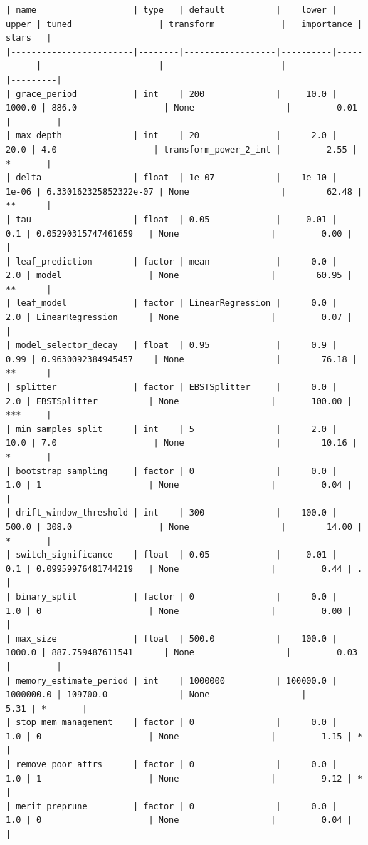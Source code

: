 \documentclass[
  letterpaper,
  DIV=11,
  numbers=noendperiod]{scrreprt}
\begin{document}
\begin{verbatim}
| name                   | type   | default          |    lower |     upper | tuned                 | transform             |   importance | stars   |
|------------------------|--------|------------------|----------|-----------|-----------------------|-----------------------|--------------|---------|
| grace_period           | int    | 200              |     10.0 |    1000.0 | 886.0                 | None                  |         0.01 |         |
| max_depth              | int    | 20               |      2.0 |      20.0 | 4.0                   | transform_power_2_int |         2.55 | *       |
| delta                  | float  | 1e-07            |    1e-10 |     1e-06 | 6.330162325852322e-07 | None                  |        62.48 | **      |
| tau                    | float  | 0.05             |     0.01 |       0.1 | 0.05290315747461659   | None                  |         0.00 |         |
| leaf_prediction        | factor | mean             |      0.0 |       2.0 | model                 | None                  |        60.95 | **      |
| leaf_model             | factor | LinearRegression |      0.0 |       2.0 | LinearRegression      | None                  |         0.07 |         |
| model_selector_decay   | float  | 0.95             |      0.9 |      0.99 | 0.9630092384945457    | None                  |        76.18 | **      |
| splitter               | factor | EBSTSplitter     |      0.0 |       2.0 | EBSTSplitter          | None                  |       100.00 | ***     |
| min_samples_split      | int    | 5                |      2.0 |      10.0 | 7.0                   | None                  |        10.16 | *       |
| bootstrap_sampling     | factor | 0                |      0.0 |       1.0 | 1                     | None                  |         0.04 |         |
| drift_window_threshold | int    | 300              |    100.0 |     500.0 | 308.0                 | None                  |        14.00 | *       |
| switch_significance    | float  | 0.05             |     0.01 |       0.1 | 0.09959976481744219   | None                  |         0.44 | .       |
| binary_split           | factor | 0                |      0.0 |       1.0 | 0                     | None                  |         0.00 |         |
| max_size               | float  | 500.0            |    100.0 |    1000.0 | 887.759487611541      | None                  |         0.03 |         |
| memory_estimate_period | int    | 1000000          | 100000.0 | 1000000.0 | 109700.0              | None                  |         5.31 | *       |
| stop_mem_management    | factor | 0                |      0.0 |       1.0 | 0                     | None                  |         1.15 | *       |
| remove_poor_attrs      | factor | 0                |      0.0 |       1.0 | 1                     | None                  |         9.12 | *       |
| merit_preprune         | factor | 0                |      0.0 |       1.0 | 0                     | None                  |         0.04 |         |
\end{verbatim}
\end{document}

